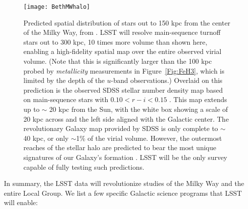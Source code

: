 \begin{figure}
\texttt{[image: BethMWhalo]}
\caption{Predicted spatial distribution of stars out to 150 kpc from the center of the Milky Way,
from \citet{2005ApJ...635..931B}.  LSST will resolve main-sequence turnoff stars out to 300 kpc, 10 times
more volume than shown here, enabling a high-fidelity spatial map over
the entire observed virial volume. (Note that this is significantly larger than the
100 kpc probed by \emph{metallicity} measurements in
Figure~\ref{Fig:FeH3}, which is limited by the depth of the $u$-band observations.)
Overlaid on this prediction is the observed SDSS stellar number density map based on main-sequence stars
with $0.10 < r-i < 0.15$ \citep{2008ApJ...673..864J}.  This map extends up to $\sim$ 20 kpc from the Sun, with
the white box showing a scale of 20 kpc across and the left side aligned with the Galactic center.
The revolutionary Galaxy map provided by SDSS is only complete to $\sim$40 kpc, or only $\sim$1\% of
the virial volume.  However, the outermost reaches of the stellar halo are predicted to bear the most unique
signatures of our Galaxy's formation \citep{2008ApJ...689..936J,2010MNRAS.406..744C}.   LSST will be the only survey
capable of fully testing such predictions.}
\label{Fig:halo}
\end{figure}



In summary, the LSST data will revolutionize studies of the Milky Way and the entire Local Group. We list a few specific
Galactic science programs that LSST will enable:


